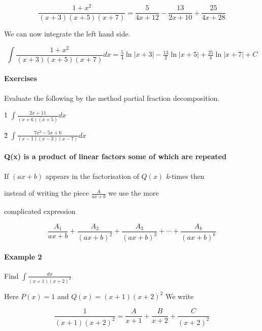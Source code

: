 $$\frac{1+x^2}{(x+3)(x+5)(x+7)}=\frac{5}{4x+12}-\frac{13}{2x+10}+\frac{25}{4x+28}$$



We can now integrate the left hand side.



$$\int\frac{1+x^2}{(x+3)(x+5)(x+7)}dx=\tfrac{5}{4}\ln\Big|x+3\Big|-\tfrac{13}{2}\ln\Big|x+5\Big|+\tfrac{25}{4}\ln\Big|x+7\Big|+C$$



\paragraph{Exercises}



Evaluate the following by the method partial fraction decomposition.



1\. $\int\frac{2x+11}{(x+6)(x+5)}dx$



2\. $\int\frac{7x^2-5x+6}{(x-1)(x-3)(x-7)}dx$



\paragraph{Q(x) is a product of linear factors some of which are repeated}



If $(ax+b)$ appears in the factorisation of $Q(x)$ \textit{k}-times then

instead of writing the piece $\frac{A}{ax+b}$ we use the more

complicated expression



$$\frac{A _1}{ax+b}+\frac{A _2}{(ax+b)^2}+\frac{A _3}{(ax+b)^3}+\cdots+\frac{A _k}{(ax+b)^k}$$



\paragraph{Example 2}



Find $\int\frac{dx}{(x+1)(x+2)^2}$



Here $P(x)=1$ and $Q(x)=(x+1)(x+2)^2$ We write



$$\frac{1}{(x+1)(x+2)^2}=\frac{A}{x+1}+\frac{B}{x+2}+\frac{C}{(x+2)^2}$$




